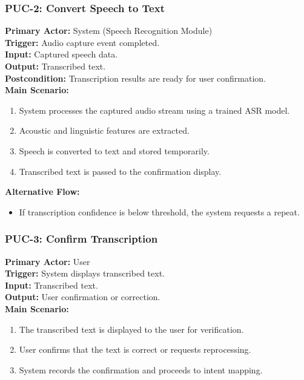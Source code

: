 \documentclass[11pt]{article}
\begin{document}
\bigskip

\subsubsection*{PUC-2: Convert Speech to Text}
\textbf{Primary Actor:} System (Speech Recognition Module) \\
\textbf{Trigger:} Audio capture event completed. \\
\textbf{Input:} Captured speech data. \\
\textbf{Output:} Transcribed text. \\
\textbf{Postcondition:} Transcription results are ready for user confirmation. \\

\textbf{Main Scenario:}
\begin{enumerate}
  \item System processes the captured audio stream using a trained ASR model.
  \item Acoustic and linguistic features are extracted.
  \item Speech is converted to text and stored temporarily.
  \item Transcribed text is passed to the confirmation display.
\end{enumerate}

\textbf{Alternative Flow:}
\begin{itemize}
  \item If transcription confidence is below threshold, the system requests a repeat.
\end{itemize}

\bigskip

\subsubsection*{PUC-3: Confirm Transcription}
\textbf{Primary Actor:} User \\
\textbf{Trigger:} System displays transcribed text. \\
\textbf{Input:} Transcribed text. \\
\textbf{Output:} User confirmation or correction. \\

\textbf{Main Scenario:}
\begin{enumerate}
  \item The transcribed text is displayed to the user for verification.
  \item User confirms that the text is correct or requests reprocessing.
  \item System records the confirmation and proceeds to intent mapping.
\end{enumerate}
\end{document}
